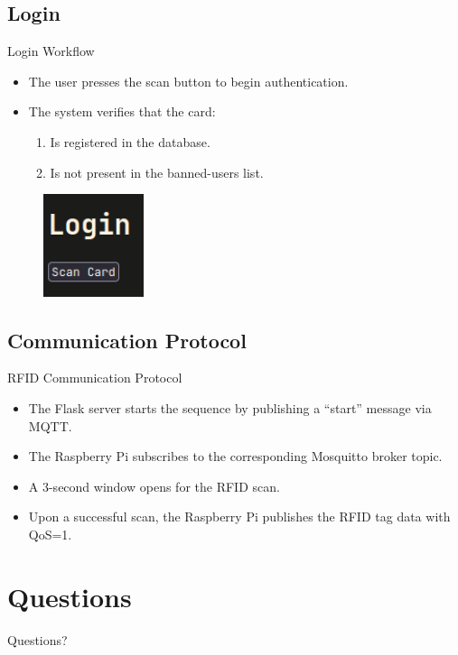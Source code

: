 \documentclass[t, aspectratio=169, 10pt]{beamer}
\begin{document}
\subsection{Login}
\begin{frame}{Login Workflow}
    \begin{itemize}
        \item The user presses the scan button to begin authentication.
        \item The system verifies that the card:
            \begin{enumerate}
                \item Is registered in the database.
                \item Is not present in the banned-users list.
            \end{enumerate}
    \end{itemize}
    \begin{figure}
        \centering
        \includegraphics[height=3cm]{images/login.png}
    \end{figure}
\end{frame}

\subsection{Communication Protocol}
\begin{frame}{RFID Communication Protocol}
    \begin{itemize}
        \item The Flask server starts the sequence by publishing a “start” message via MQTT.
        \item The Raspberry Pi subscribes to the corresponding Mosquitto broker topic.
        \item A 3-second window opens for the RFID scan.
        \item Upon a successful scan, the Raspberry Pi publishes the RFID tag data with QoS=1.
    \end{itemize}
\end{frame}

\section*{Questions}
\begin{frame}
    \centering
    \vspace{2cm}
    {\Huge Questions?}
\end{frame}
\end{document}
